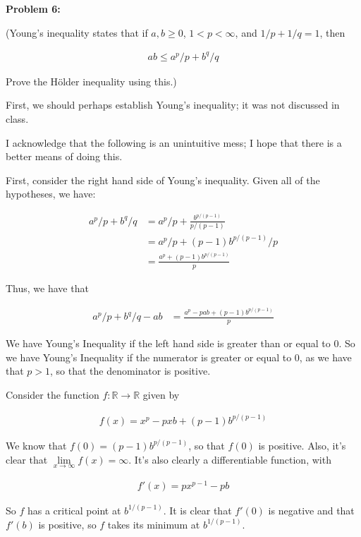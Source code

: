 \documentclass[a4paper,12pt]{article}
\newcommand{\shunt}{\vspace{20mm}}
\newcommand{\R}{\mathbb{R}}
\begin{document}
\shunt

{\bf Problem 6:} 

(Young's inequality states that if $a,b \geq 0$, $1 < p < \infty$, and $1/p + 1/q =1$, then

\begin{align*}
ab \leq a^p/p + b^q/q
\end{align*}

Prove the H{\"o}lder inequality using this.)

First, we should perhaps establish Young's inequality; it was not discussed in class.

I acknowledge that the following is an unintuitive mess; I hope that there is a better means of doing this.

First, consider the right hand side of Young's inequality. Given all of the hypotheses, we have:

\begin{align*}
a^p/p + b^q/q &= a^p/p +\frac{b^{p/(p-1)}}{p/(p-1)}\\
&=a^p/p + (p-1)b^{p/(p-1)}/p\\
&=\frac{a^p+(p-1)b^{p/(p-1)}}{p}
\end{align*}

Thus, we have that

\begin{align*}
a^p/p+b^q/q -ab &= \frac{a^p-pab+(p-1)b^{p/(p-1)}}{p}
\end{align*}

We have Young's Inequality if the left hand side is greater than or equal to $0$. So we have Young's Inequality if the numerator is greater or equal to $0$, as we have that $p>1$, so that the denominator is positive.

Consider the function $f: \R \to \R$ given by 

\begin{align*}
f(x) = x^p-pxb+(p-1)b^{p/(p-1)}
\end{align*}

We know that $f(0) = (p-1)b^{p/(p-1)}$, so that $f(0)$ is positive. Also, it's clear that $\lim\limits_{x \to \infty} f(x) = \infty$. It's also clearly a differentiable function, with

\begin{align*}
f'(x) = px^{p-1} - pb
\end{align*}

So $f$ has a critical point at $b^{1/(p-1)}$. It is clear that $f'(0)$ is negative and that $f'(b)$ is positive, so $f$ takes its minimum at $b^{1/(p-1)}$.
\end{document}
